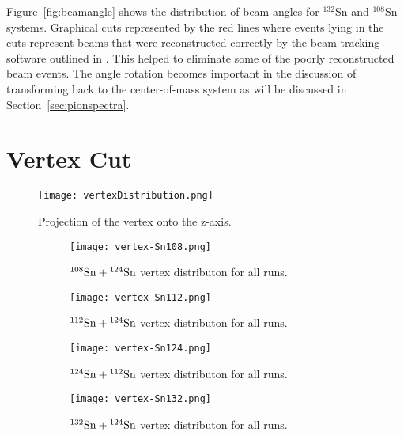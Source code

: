 Figure~\ref{fig:beamangle} shows the distribution of beam angles for ${}^{132}$Sn and ${}^{108}$Sn systems. Graphical cuts represented by the red lines where events lying in the cuts represent beams that were reconstructed correctly by the beam tracking software outlined in \cite{jon}. This helped to eliminate some of the poorly reconstructed beam events. The angle rotation becomes important in the discussion of transforming back to the center-of-mass system as will be discussed in Section~\ref{sec:pionspectra}.



\section{Vertex Cut}
\label{sec:vertexcut}

\begin{figure}[!htb]
\centering
\texttt{[image: vertexDistribution.png]}
\caption{Projection of the vertex onto the z-axis.}
\label{fig:overviewVertex}
\end{figure}


\begin{figure}[!htb]
\centering
    \begin{subfigure}[t]{\textwidth}
        \centering
        \texttt{[image: vertex-Sn108.png]} 
        \caption{${}^{108}\mathrm{Sn} + {}^{124}\mathrm{Sn}$ vertex distributon for all runs.} \label{fig:vertex108}
    \end{subfigure}
    \hfill
    \begin{subfigure}[t]{\textwidth}
        \centering
        \texttt{[image: vertex-Sn112.png]} 
        \caption{${}^{112}\mathrm{Sn} + {}^{124}\mathrm{Sn}$ vertex distributon for all runs.} \label{fig:vertex112}
    \end{subfigure}
    
    \begin{subfigure}[t]{\textwidth}
        \centering
        \texttt{[image: vertex-Sn124.png]} 
        \caption{${}^{124}\mathrm{Sn} + {}^{112}\mathrm{Sn}$ vertex distributon for all runs.} \label{fig:vertex124}
    \end{subfigure}
    \hfill
    \begin{subfigure}[t]{\textwidth}
        \centering
        \texttt{[image: vertex-Sn132.png]} 
        \caption{${}^{132}\mathrm{Sn} + {}^{124}\mathrm{Sn}$ vertex distributon for all runs.} \label{fig:vertex132}
    \end{subfigure}
\caption{}
\label{fig:vertexdist}
\end{figure}

